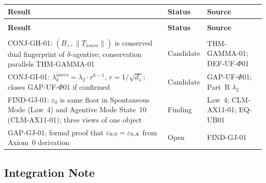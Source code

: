 \documentclass[12pt, a4paper]{article}
\providecommand{\eps}{\varepsilon_0}
\providecommand{\ltwo}{\lambda_2}
\providecommand{\Bplus}{B_{+}}
\providecommand{\Tasava}{T_{\bar{\mathrm{a}}sava}}
\providecommand{\lk}{\lambda_k^{\mathrm{\bar{a}sava}}}
\providecommand{\Tasava}{\mathcal{T}_{\!\mathrm{\bar{a}sava}}}
\begin{document}
{\small
\setlength{\LTpre}{4pt}\setlength{\LTpost}{4pt}
\renewcommand{\arraystretch}{1.30}
\begin{longtable}{>{\raggedright\arraybackslash}p{5.8cm}
                  >{\centering\arraybackslash}p{2.4cm}
                  >{\raggedright\arraybackslash}p{4.1cm}}
\toprule
\textbf{Result} & \textbf{Status} & \textbf{Source} \\
\midrule
\endfirsthead
\multicolumn{3}{l}{\small\textit{(continued)}}\\[4pt]
\toprule
\textbf{Result} & \textbf{Status} & \textbf{Source} \\
\midrule
\endhead
\midrule
\multicolumn{3}{r}{\small\textit{(continues)}}\\
\endfoot
\bottomrule
\endlastfoot

CONJ-GH-01: $(\Bplus, \|\Tasava\|)$ is conserved
  dual fingerprint of $\delta$-agentive; conservation
  parallels THM-GAMMA-01 &
  Candidate & THM-GAMMA-01; DEF-UF-$\Phi$01 \\

CONJ-GI-01: $\lk = \ltwo\cdot r^{k-1}$,
  $r = 1/\sqrt{d_s}$; closes GAP-UF-$\Phi$01 if confirmed &
  Candidate & GAP-UF-$\Phi$01; Part~B $\ltwo$ \\

FIND-GJ-01: $\eps$ is same floor in Spontaneous Mode
  (Law~4) and Agentive Mode State~10 (CLM-AX11-01);
  three views of one object &
  Finding & Law~4; CLM-AX11-01; EQ-UB01 \\

GAP-GJ-01: formal proof that $\varepsilon_{0,\rm S}
  = \varepsilon_{0,\rm A}$ from Axiom~0 derivation &
  Open & FIND-GJ-01 \\

\end{longtable}
}
\vspace{-\parskip}

\subsection{Integration Note}

\end{document}
